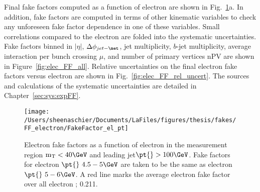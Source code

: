Final fake factors computed as a function of electron \pt{} are shown in Fig.~\ref{fig:elec_FF_hist}a.  In addition, fake factors are computed in terms of other kinematic variables to check any unforeseen fake factor dependence in one of these variables.  Small correlations compared to the electron \pt are folded into the systematic uncertainties.  
Fake factors binned in $|\eta|$, $\Delta\phi_{jet-\met}$, jet multiplicity, $b$-jet multiplicity, average interaction per bunch crossing $\mu$, and number of primary vertices nPV are shown in Figure~\ref{fig:elec_FF_all}.  Relative uncertainties on the final electron fake factors versus electron \pt{} are shown in Fig.~\ref{fig:elec_FF_rel_uncert}.   The sources and calculations of the systematic uncertainties are detailed in Chapter~\ref{sec:sys:expFF}. 
\begin{figure}[tbp]
  \centering
  \texttt{[image: /Users/sheenaschier/Documents/LaFiles/figures/thesis/fakes/FF\_electron/FakeFactor\_el\_pt]}
  \caption{Electron fake factors as a function of electron \pt{} in the measurement region $\mathrm{m_T} < 40\GeV$ and leading jet$ \pt{}>100\GeV$.  Fake factors for electron $\pt{}~ 4.5-5\GeV$ are taken to be the same as electron $\pt{}~5-6\GeV$.  A red line marks the average electron fake factor over all electron \pt{}; 0.211. }
  \label{fig:elec_FF_hist}
\end{figure}

